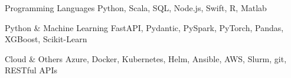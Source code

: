 \begin{cvskills}

  \cvskill
    {Programming Languages}
    {Python, Scala, SQL, Node.js, Swift, R, Matlab}

  \cvskill
    {Python \& Machine Learning}
    {FastAPI, Pydantic, PySpark, PyTorch, Pandas, XGBoost, Scikit-Learn}

  \cvskill
    {Cloud \& Others}
    {Azure, Docker, Kubernetes, Helm, Ansible, AWS, Slurm, git, RESTful APIs}

\end{cvskills}

